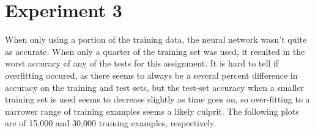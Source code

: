 \documentclass{article}
\begin{document}
\begin{figure}[h!]
\centering
{}
\end{figure}

\begin{figure}[h!]
\centering
{}
\end{figure}


\clearpage
\section{Experiment 3}

\begin{flushleft}
When only using a portion of the training data, the neural network wasn't quite as accurate.  When only a quarter of the training set was used, it resulted in the worst accuracy of any of the tests for this assignment.  It is hard to tell if overfitting occured, as there seems to always be a several percent difference in accuracy on the training and test sets, but the test-set accuracy when a smaller training set is used seems to decrease slightly as time goes on, so over-fitting to a narrower range of training examples seems a likely culprit.  The following plots are of 15,000 and 30,000 training examples, respectively.
\end{flushleft}

\begin{figure}[h!]
\centering
{}
\end{figure}
\end{document}
